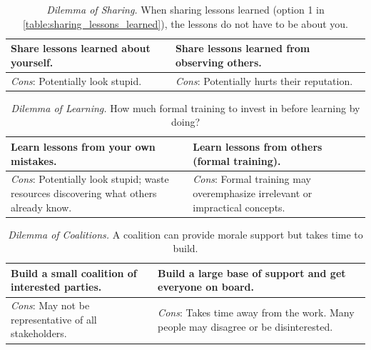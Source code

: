 \begin{center}
\begin{table}[H] %
\begin{tabular}{ | m{\dilemmatablewidth}| m{\dilemmatablewidth} | } 
  \hline
  \textbf{Share lessons learned about yourself.} & 
  \textbf{Share lessons learned from observing others.} \\ 
  \hline
  \textit{Cons}: Potentially look stupid. & 
  \textit{Cons}: Potentially hurts their reputation. \\  
  \hline
\end{tabular}
\caption{\textit{Dilemma of Sharing.}
When sharing lessons learned (option 1 in \ref{table:sharing_lessons_learned}), the lessons do not have to be about you. 
}
\label{table:share_lessons_learned}
\end{table}
\end{center}

\begin{center}
\begin{table}[H] %
\begin{tabular}{ | m{\dilemmatablewidth}| m{\dilemmatablewidth} | } 
  \hline
  \textbf{Learn lessons from your own mistakes.} & 
  \textbf{Learn lessons from others (formal training).} \\ 
  \hline
  \textit{Cons}: Potentially look stupid; waste resources discovering what others already know. & 
  \textit{Cons}: Formal training may overemphasize irrelevant or impractical concepts. \\  
  \hline
\end{tabular}
\caption{\textit{Dilemma of Learning.}
How much formal training to invest in before learning by doing?
}
\label{table:lessons_learned_source}
\end{table}
\end{center}



\begin{center}
\begin{table}[H] %
\begin{tabular}{ | m{\dilemmatablewidth}| m{\dilemmatablewidth} | } 
  \hline
  \textbf{Build a small coalition of interested parties.} & 
  \textbf{Build a large base of support and get everyone on board.} \\ 
  \hline
  \textit{Cons}: May not be representative of all stakeholders. & 
  \textit{Cons}: Takes time away from the work. Many people may disagree or be disinterested. \\  
  \hline
\end{tabular}
\caption{\textit{Dilemma of Coalitions.}
A coalition can provide morale support but takes time to build.
}
\label{table:how_to_change}
\end{table}
\end{center}

